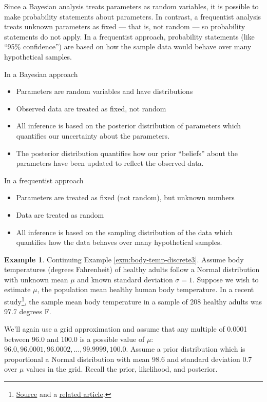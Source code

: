 \documentclass[
]{book}
\providecommand{\tightlist}{%
  \setlength{\itemsep}{0pt}\setlength{\parskip}{0pt}}
\theoremstyle{definition}
\theoremstyle{definition}
\newtheorem{example}{Example}[chapter]
\theoremstyle{definition}
\theoremstyle{remark}
\begin{document}
Since a Bayesian analysis treats parameters as random variables, it is possible to make probability statements about parameters. In contrast, a frequentist analysis treats unknown parameters as fixed --- that is, not random --- so probability statements do not apply. In a frequentist approach, probability statements (like ``95\% confidence'') are based on how the sample data would behave over many hypothetical samples.

In a Bayesian approach

\begin{itemize}
\tightlist
\item
  Parameters are random variables and have distributions
\item
  Observed data are treated as fixed, not random
\item
  All inference is based on the posterior distribution of parameters which quantifies our uncertainty about the parameters.
\item
  The posterior distribution quantifies how our prior ``beliefs'' about the parameters have been updated to reflect the observed data.
\end{itemize}

In a frequentist approach

\begin{itemize}
\tightlist
\item
  Parameters are treated as fixed (not random), but unknown numbers
\item
  Data are treated as random
\item
  All inference is based on the sampling distribution of the data which quantifies how the data behaves over many hypothetical samples.
\end{itemize}

\begin{example}
\protect\hypertarget{exm:body-temp-credible}{}{\label{exm:body-temp-credible} }
Continuing Example \ref{exm:body-temp-discrete3}. Assume body temperatures (degrees Fahrenheit) of healthy adults follow a Normal distribution with unknown mean \(\mu\) and known standard deviation \(\sigma=1\).
Suppose we wish to estimate \(\mu\), the population mean healthy human body temperature.
In a recent study\footnote{\href{https://www.ncbi.nlm.nih.gov/pmc/articles/PMC6258625/}{Source} and a \href{https://www.scientificamerican.com/article/are-human-body-temperatures-cooling-down/}{related article}.}, the sample mean body temperature in a sample of 208 healthy adults was 97.7 degrees F.

We'll again use a grid approximation and assume that any multiple of 0.0001 between 96.0 and 100.0 is a possible value of \(\mu\): \(96.0, 96.0001, 96.0002, \ldots, 99.9999, 100.0\). Assume a prior distribution which is proportional a Normal distribution with mean 98.6 and standard deviation 0.7 over \(\mu\) values in the grid. Recall the prior, likelihood, and posterior.
\end{example}
\end{document}
